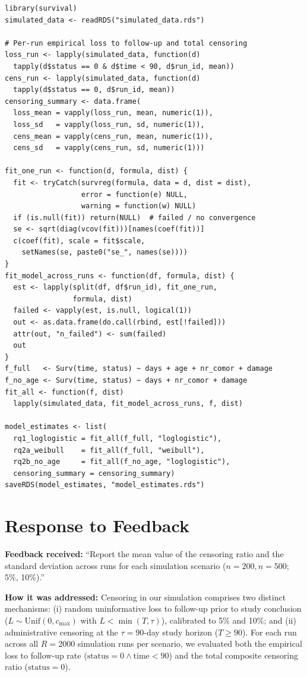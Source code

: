 \documentclass[10pt,a4paper]{article}
\begin{document}
\begin{minipage}[t]{0.49\textwidth}
\begin{lstlisting}[style=rcode]
library(survival)
simulated_data <- readRDS("simulated_data.rds")

# Per-run empirical loss to follow-up and total censoring
loss_run <- lapply(simulated_data, function(d)
  tapply(d$status == 0 & d$time < 90, d$run_id, mean))
cens_run <- lapply(simulated_data, function(d)
  tapply(d$status == 0, d$run_id, mean))
censoring_summary <- data.frame(
  loss_mean = vapply(loss_run, mean, numeric(1)),
  loss_sd   = vapply(loss_run, sd, numeric(1)),
  cens_mean = vapply(cens_run, mean, numeric(1)),
  cens_sd   = vapply(cens_run, sd, numeric(1)))

fit_one_run <- function(d, formula, dist) {
  fit <- tryCatch(survreg(formula, data = d, dist = dist),
                  error = function(e) NULL,
                  warning = function(w) NULL)
  if (is.null(fit)) return(NULL)  # failed / no convergence
  se <- sqrt(diag(vcov(fit)))[names(coef(fit))]
  c(coef(fit), scale = fit$scale,
    setNames(se, paste0("se_", names(se))))
}
fit_model_across_runs <- function(df, formula, dist) {
  est <- lapply(split(df, df$run_id), fit_one_run,
                formula, dist)
  failed <- vapply(est, is.null, logical(1))
  out <- as.data.frame(do.call(rbind, est[!failed]))
  attr(out, "n_failed") <- sum(failed)
  out
}
f_full   <- Surv(time, status) ~ days + age + nr_comor + damage
f_no_age <- Surv(time, status) ~ days + nr_comor + damage
fit_all <- function(f, dist)
  lapply(simulated_data, fit_model_across_runs, f, dist)

model_estimates <- list(
  rq1_loglogistic = fit_all(f_full, "loglogistic"),
  rq2a_weibull    = fit_all(f_full, "weibull"),
  rq2b_no_age     = fit_all(f_no_age, "loglogistic"),
  censoring_summary = censoring_summary)
saveRDS(model_estimates, "model_estimates.rds")
\end{lstlisting}
\end{minipage}

\section*{Response to Feedback}
\textbf{Feedback received:} ``Report the mean value of the censoring ratio and the standard deviation across runs for each simulation scenario ($n=200, n=500$; 5\%, 10\%).''

\textbf{How it was addressed:} Censoring in our simulation comprises two distinct mechanisms: (i) random uninformative loss to follow-up prior to study conclusion ($L \sim \text{Unif}(0, c_{\max})$ with $L < \min(T, \tau)$), calibrated to 5\% and 10\%; and (ii) administrative censoring at the $\tau = 90$-day study horizon ($T \ge 90$). For each run across all $R=2000$ simulation runs per scenario, we evaluated both the empirical loss to follow-up rate ($\text{status}=0 \land \text{time} < 90$) and the total composite censoring ratio ($\text{status}=0$).
\end{document}
